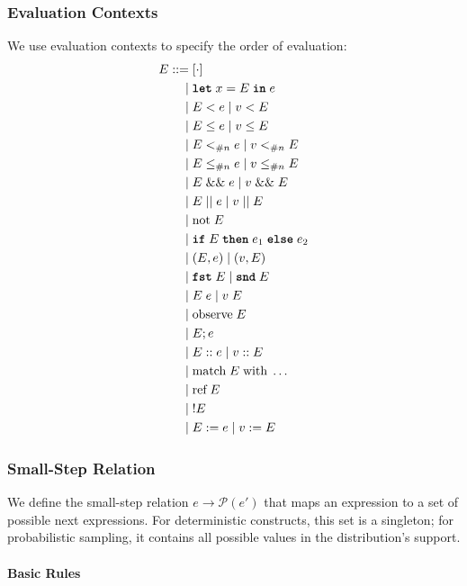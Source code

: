\subsubsection{Evaluation Contexts}

We use evaluation contexts to specify the order of evaluation:
\begin{align*}
E ::= &\; [\cdot] \\
    | &\; \textnormal{\ttfamily\bfseries let} \; x = E \; \textnormal{\ttfamily\bfseries in} \; e \\
    | &\; E < e \mid v < E \\
    | &\; E \leq e \mid v \leq E \\
    | &\; E <_{\#{n}} e \mid v <_{\#{n}} E \\
    | &\; E \leq_{\#{n}} e \mid v \leq_{\#{n}} E \\
    | &\; E \mathrel{\&\&} e \mid v \mathrel{\&\&} E \\
    | &\; E \mathrel{||} e \mid v \mathrel{||} E \\
    | &\; \text{not}\; E \\
    | &\; \textnormal{\ttfamily\bfseries if} \; E \; \textnormal{\ttfamily\bfseries then} \; e_1 \; \textnormal{\ttfamily\bfseries else} \; e_2 \\
    | &\; (E, e) \mid (v, E) \\
    | &\; \textnormal{\ttfamily\bfseries fst} \; E \mid \textnormal{\ttfamily\bfseries snd} \; E \\
    | &\; E \; e \mid v \; E \\
    | &\; \text{observe}\; E \\
    | &\; E; e \\
    | &\; E :: e \mid v :: E \\
    | &\; \text{match}\; E \; \text{with}\; \ldots \\
    | &\; \text{ref}\; E \\
    | &\; !E \\
    | &\; E := e \mid v := E
\end{align*}

\subsubsection{Small-Step Relation}

We define the small-step relation $e \rightarrow \mathcal{P}(e')$ that maps an expression to a set of possible next expressions. For deterministic constructs, this set is a singleton; for probabilistic sampling, it contains all possible values in the distribution's support.

\paragraph{Basic Rules}

